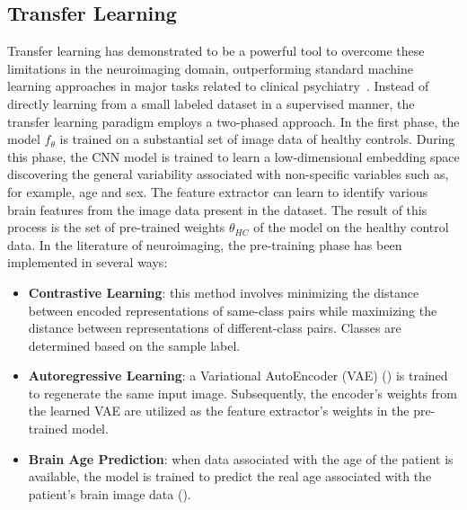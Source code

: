 \subsection{Transfer Learning}
Transfer learning has demonstrated to be a powerful tool to overcome these
limitations in the neuroimaging domain, outperforming standard machine learning
approaches in major tasks related to clinical
psychiatry~. Instead of directly learning
from a small labeled dataset in a supervised manner, the transfer learning
paradigm employs a two-phased approach. In the first phase, the model
$f_{\theta}$ is trained on a substantial set of image data of healthy
controls. During this phase, the CNN model is trained to learn a
low-dimensional embedding space discovering the general variability associated
with non-specific variables such as, for example, age and sex. The feature
extractor can learn to identify various brain features from the image data
present in the dataset. The result of this process is the set of pre-trained
weights $\theta_{HC}$ of the model on the healthy control data. In the
literature of neuroimaging, the pre-training phase has been implemented in
several ways:
\begin{itemize}
    \item \textbf{Contrastive Learning}: this method involves minimizing the
    distance between encoded representations of same-class pairs while maximizing the
    distance between representations of different-class pairs. Classes are
    determined based on the sample label.
    \item \textbf{Autoregressive Learning}: a Variational AutoEncoder (VAE)
    () is trained to regenerate the same input image.
    Subsequently, the encoder's weights from the learned VAE are utilized as the
    feature extractor's weights in the pre-trained model.
    \item \textbf{Brain Age Prediction}: when data associated with the age of
    the patient is available, the model is trained to predict the real age
    associated with the patient's brain image data ().
\end{itemize}
